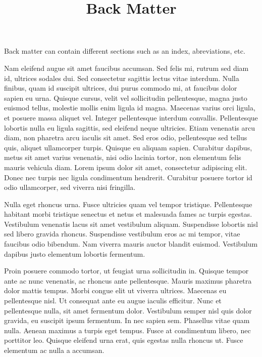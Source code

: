 \documentclass{article}
\begin{document}
\title{Back Matter}

\maketitle


Back matter can contain different sections such as an index, abreviations, etc.


Nam eleifend augue sit amet faucibus accumsan. Sed felis mi, rutrum sed diam id, ultrices sodales dui. Sed consectetur sagittis lectus vitae interdum. Nulla finibus, quam id suscipit ultrices, dui purus commodo mi, at faucibus dolor sapien eu urna. Quisque cursus, velit vel sollicitudin pellentesque, magna justo euismod tellus, molestie mollis enim ligula id magna. Maecenas varius orci ligula, et posuere massa aliquet vel. Integer pellentesque interdum convallis. Pellentesque lobortis nulla eu ligula sagittis, sed eleifend neque ultricies. Etiam venenatis arcu diam, non pharetra arcu iaculis sit amet. Sed eros odio, pellentesque sed tellus quis, aliquet ullamcorper turpis. Quisque eu aliquam sapien. Curabitur dapibus, metus sit amet varius venenatis, nisi odio lacinia tortor, non elementum felis mauris vehicula diam. Lorem ipsum dolor sit amet, consectetur adipiscing elit. Donec nec turpis nec ligula condimentum hendrerit. Curabitur posuere tortor id odio ullamcorper, sed viverra nisi fringilla.


Nulla eget rhoncus urna. Fusce ultricies quam vel tempor tristique. Pellentesque habitant morbi tristique senectus et netus et malesuada fames ac turpis egestas. Vestibulum venenatis lacus sit amet vestibulum aliquam. Suspendisse lobortis nisl sed libero gravida rhoncus. Suspendisse vestibulum eros ac mi tempor, vitae faucibus odio bibendum. Nam viverra mauris auctor blandit euismod. Vestibulum dapibus justo elementum lobortis fermentum.


Proin posuere commodo tortor, ut feugiat urna sollicitudin in. Quisque tempor ante ac nunc venenatis, ac rhoncus ante pellentesque. Mauris maximus pharetra dolor mattis tempus. Morbi congue elit ut viverra ultrices. Maecenas eu pellentesque nisl. Ut consequat ante eu augue iaculis efficitur. Nunc et pellentesque nulla, sit amet fermentum dolor. Vestibulum semper nisl quis dolor gravida, eu suscipit ipsum fermentum. In nec sapien sem. Phasellus vitae quam nulla. Aenean maximus a turpis eget tempus. Fusce at condimentum libero, nec porttitor leo. Quisque eleifend urna erat, quis egestas nulla rhoncus ut. Fusce elementum ac nulla a accumsan.
\end{document}
